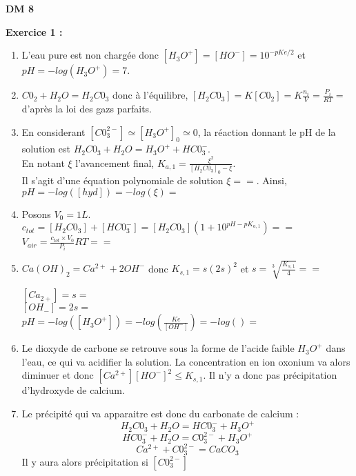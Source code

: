 \documentclass[a4paper, 10pt]{article}
\def \hyd { H_{3}O^{+}}
\def \hox { HO^{-} }
\def \coo {C0_{2}}
\def \eau {H_{2}O }
\def \hhco {H_{2}C0_{3} }
\def \hco {HC0_{3}^{-} }
\def \co {C0_{3}^{2-} }
\begin{document}
\pagestyle{fancy}

\begin{center}
\textsc{\bfseries\huge DM 8}
\end{center}
\textbf{\large Exercice 1 :}

\begin{enumerate}[label=\arabic*)]

	\item L'eau pure est non chargée donc \( [\hyd] = [\hox] = 10^{-pKe/2}\) et \( pH = -log(\hyd) = 7 \).

	\item \(\coo + \eau = \hhco \) donc à l'équilibre, \([\hhco] = K[\coo] = K\frac{n_{i}}{V} = \frac{P_{i}}{RT} = \) d'après la loi des gazs parfaits.
	\item En considerant \( [\co] \simeq [\hyd]_{0} \simeq 0 \), la réaction donnant le pH de la solution est \(\hhco + \eau = \hyd + \hco \).
		\\En notant \(\xi\) l'avancement final, \(K_{a,1}=\frac{\xi^{2}}{[\hhco]_{0} - \xi} \). 
		\\Il s'agit d'une équation polynomiale de solution \( \xi = = \). Ainsi, \(pH = -log([hyd]) = -log(\xi) = \)
	
	\item Posons \(V_{0} = 1 L\). \(  c_{tot} = [\hhco ] + [\hco] = [\hhco](1 + 10^{pH-pK_{a,1}}) = = \)\\
		\(V_{air}=\frac{c_{tot} \times V_{0}}{P_{i}}RT = = \)
	
	\item \(Ca(OH)_{2} = Ca^{2+} +2OH^{-} \) donc \(K_{s,1} = s(2s)^{2}\) et \(s=\sqrt[3]{\frac{K_{s,1}}{4}}== \)
		
		\( [Ca_{2+}]=s= \)\\
		\( [OH_{-}]=2s= \)\\
		\( pH=-log([\hyd])=-log(\frac{Ke}{[OH^{-}]})=-log()=\)
		
			
	\item Le dioxyde de carbone se retrouve sous la forme de l'acide faible \(\hyd\) dans l'eau, ce qui va acidifier la solution.
		La concentration en ion oxonium va alors diminuer et donc \( [Ca^{2+}][HO^{-}]^{2} \leq K_{s,1}\).
		Il n'y a donc pas précipitation d'hydroxyde de calcium.
	
	\item Le précipité qui va apparaitre est donc du carbonate de calcium :\\
	\[\hhco + \eau = \hco + \hyd\] \[\hco + \eau = \co + \hyd \] \[Ca^{2+} + \co = CaCO_{3}\]
		Il y aura alors précipitation si \( [\co]  \)


\end{enumerate}
\end{document}
